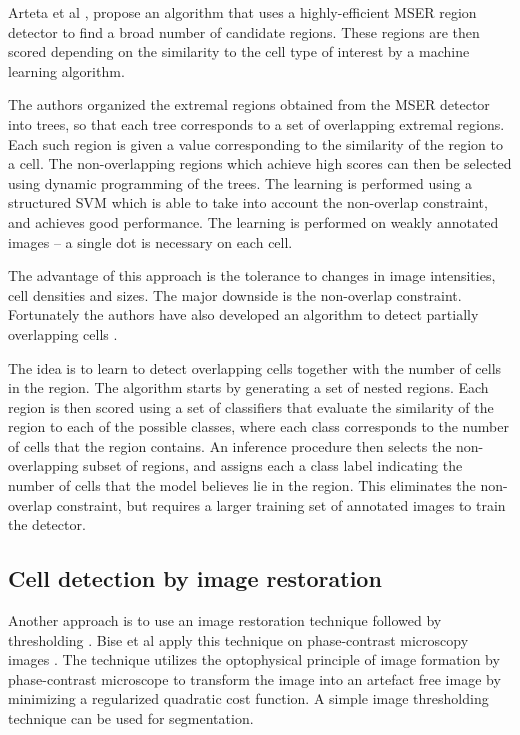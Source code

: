 Arteta et al \cite{arteta12}\cite{arteta13}, propose an algorithm that uses a highly-efficient MSER region detector \cite{matas02} to find a broad number of candidate regions. These regions are then scored depending on the similarity to the cell type of interest by a machine learning algorithm. 

The authors organized the extremal regions obtained from the MSER detector into trees, so that each tree corresponds to a set of overlapping extremal regions. Each such region is given a value corresponding to the similarity of the region to a cell. The non-overlapping regions which achieve high scores can then be selected using dynamic programming of the trees. The learning is performed using a structured SVM \cite{joachims09} which is able to take into account the non-overlap constraint, and achieves good performance. The learning is performed on weakly annotated images -- a single dot is necessary on each cell.

The advantage of this approach is the tolerance to changes in image intensities, cell densities and sizes. The major downside is the non-overlap constraint. Fortunately the authors have also developed an algorithm to detect partially overlapping cells \cite{arteta13}. 

The idea is to learn to detect overlapping cells together with the number of cells in the region. The algorithm starts by generating a set of nested regions. Each region is then scored using a set of classifiers that evaluate the similarity of the region to each of the possible classes, where each class corresponds to the number of cells that the region contains. An inference procedure then selects the non-overlapping subset of regions, and assigns each a class label indicating the number of cells that the model believes lie in the region. This eliminates the non-overlap constraint, but requires a larger training set of annotated images to train the detector.

\subsection{Cell detection by image restoration}

Another approach is to use an image restoration technique followed by thresholding \cite{bise11} \cite{huh13}. Bise et al \cite{bise11} apply this technique on phase-contrast microscopy images . The technique utilizes the optophysical principle of image formation by phase-contrast microscope to transform the image into an artefact free image by minimizing a regularized quadratic cost function. A simple image thresholding technique can be used for segmentation.

